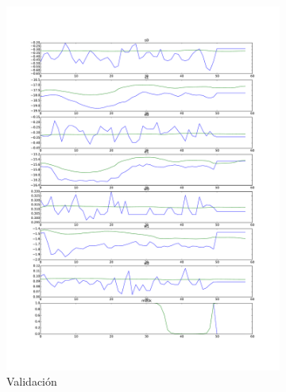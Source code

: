 \begin{figure}[hbt]
\begin{subfigure}{0.3\textwidth}
		\includegraphics[width=\linewidth]{imagenes/resultados/pred_val.pdf}
		\caption{Validación}
		\label{fig:resultados/pred_val}
	\end{subfigure}
	\begin{subfigure}{0.3\textwidth}
		\centering

\end{subfigure}
\end{figure}
